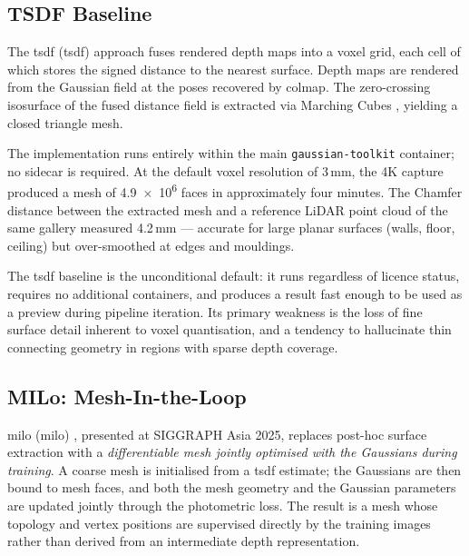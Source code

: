 \subsection{TSDF Baseline}
\label{sec:tsdf}

The \acrlong{tsdf} (\acrshort{tsdf}) approach \parencite{Curless1996} fuses rendered depth maps into a voxel grid, each cell of which stores the signed distance to the nearest surface. Depth maps are rendered from the Gaussian field at the poses recovered by \acrshort{colmap}. The zero-crossing isosurface of the fused distance field is extracted via Marching Cubes \parencite{Lorensen1987}, yielding a closed triangle mesh.

The implementation runs entirely within the main \texttt{gaussian-toolkit} container; no sidecar is required. At the default voxel resolution of 3\,mm, the 4K capture produced a mesh of \num{4.9e6} faces in approximately four minutes. The Chamfer distance between the extracted mesh and a reference LiDAR point cloud of the same gallery measured \num{4.2}\,mm --- accurate for large planar surfaces (walls, floor, ceiling) but over-smoothed at edges and mouldings.

The \acrshort{tsdf} baseline is the unconditional default: it runs regardless of licence status, requires no additional containers, and produces a result fast enough to be used as a preview during pipeline iteration. Its primary weakness is the loss of fine surface detail inherent to voxel quantisation, and a tendency to hallucinate thin connecting geometry in regions with sparse depth coverage.

\subsection{MILo: Mesh-In-the-Loop}
\label{sec:milo}

\acrlong{milo} (\acrshort{milo}) \parencite{Guedon2025MILo}, presented at SIGGRAPH Asia 2025, replaces post-hoc surface extraction with a \emph{differentiable mesh jointly optimised with the Gaussians during training}. A coarse mesh is initialised from a \acrshort{tsdf} estimate; the Gaussians are then bound to mesh faces, and both the mesh geometry and the Gaussian parameters are updated jointly through the photometric loss. The result is a mesh whose topology and vertex positions are supervised directly by the training images rather than derived from an intermediate depth representation.

